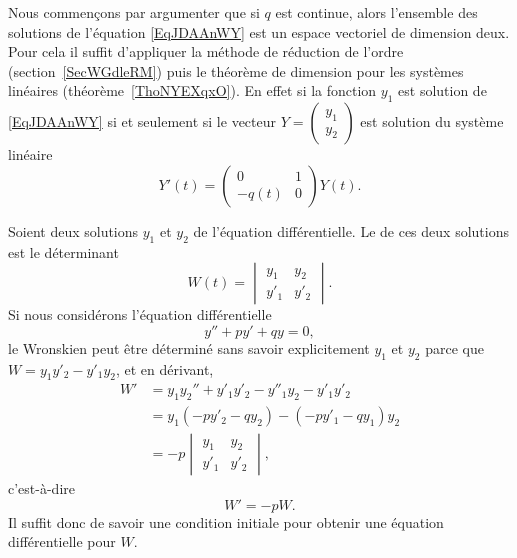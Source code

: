 Nous commençons par argumenter que si \( q\) est continue, alors l'ensemble des solutions de l'équation \eqref{EqJDAAnWY} est un espace vectoriel de dimension deux. Pour cela il suffit d'appliquer la méthode de réduction de l'ordre (section~\ref{SecWGdleRM}) puis le théorème de dimension pour les systèmes linéaires (théorème~\ref{ThoNYEXqxO}). En effet si la fonction \( y_1\) est solution de \eqref{EqJDAAnWY} si et seulement si le vecteur \(Y= \begin{pmatrix}
    y_1    \\
    y_2
\end{pmatrix}\) est solution du système linéaire
\begin{equation}
    Y'(t)=\begin{pmatrix}
        0    &   1    \\
        -q(t)    &   0
    \end{pmatrix}Y(t).
\end{equation}

Soient deux solutions \( y_1\) et \( y_2\) de l'équation différentielle. Le  de ces deux solutions est le déterminant
\begin{equation}
    W(t)=\begin{vmatrix}
        y_1    &   y_2    \\
        y'_1    &   y'_2
    \end{vmatrix}.
\end{equation}
Si nous considérons l'équation différentielle
\begin{equation}
    y''+py'+qy=0,
\end{equation}
le Wronskien peut être déterminé sans savoir explicitement \( y_1\) et \( y_2\) parce que \( W=y_1y'_2-y'_1y_2\), et en dérivant,
\begin{subequations}
    \begin{align}
        W'&=y_1y_2''+y'_1y'_2-y''_1y_2-y'_1y'_2\\
        &=y_1(-py'_2-qy_2)-(-py'_1-qy_1)y_2\\
        &=-p\begin{vmatrix}
            y_1  & y_2    \\
            y'_1 & y'_2
        \end{vmatrix},
    \end{align}
\end{subequations}
c'est-à-dire
\begin{equation}    \label{EqHEMRgM}
    W'=-pW.
\end{equation}
Il suffit donc de savoir une condition initiale pour obtenir une équation différentielle pour \( W\).

